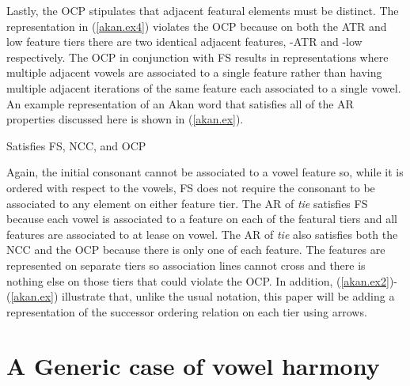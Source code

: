 \documentclass[floatsintext,man]{apa6}
\theoremstyle{definition}
\theoremstyle{definition}
\theoremstyle{definition}
\theoremstyle{remark}
\begin{document}
Lastly, the OCP stipulates that adjacent featural elements must be
distinct. The representation in (\ref{akan.ex4}) violates the OCP
because on both the ATR and low feature tiers there are two identical
adjacent features, -ATR and -low respectively. The OCP in conjunction
with FS results in representations where multiple adjacent vowels are
associated to a single feature rather than having multiple adjacent
iterations of the same feature each associated to a single vowel. An
example representation of an Akan word that satisfies all of the AR
properties discussed here is shown in (\ref{akan.ex}).

\begin{exe}
\ex \label{akan.ex} Satisfies FS, NCC, and OCP
\end{exe}

Again, the initial consonant cannot be associated to a vowel feature so,
while it is ordered with respect to the vowels, FS does not require the
consonant to be associated to any element on either feature tier. The AR
of \emph{tie} satisfies FS because each vowel is associated to a feature
on each of the featural tiers and all features are associated to at
lease on vowel. The AR of \emph{tie} also satisfies both the NCC and the
OCP because there is only one of each feature. The features are
represented on separate tiers so association lines cannot cross and
there is nothing else on those tiers that could violate the OCP. In
addition, (\ref{akan.ex2})-(\ref{akan.ex}) illustrate that, unlike the
usual notation, this paper will be adding a representation of the
successor ordering relation on each tier using arrows.

\section{A Generic case of vowel
harmony}\label{a-generic-case-of-vowel-harmony}
\end{document}

